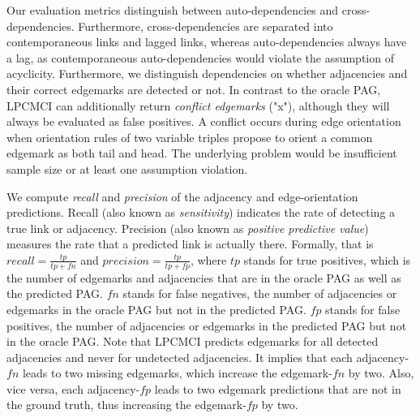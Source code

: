 \documentclass[conference]{IEEEtran}
\begin{document}
Our evaluation metrics distinguish between auto-dependencies and cross-dependencies. Furthermore, cross-dependencies are separated into contemporaneous links and lagged links, whereas auto-dependencies always have a lag, as contemporaneous auto-dependencies would violate the assumption of acyclicity.
Furthermore, we distinguish dependencies on whether adjacencies and their correct edgemarks are detected or not. In contrast to the oracle PAG, LPCMCI can additionally return \textit{conflict edgemarks} ("x"), although they will always be evaluated as false positives.
A conflict occurs during edge orientation when orientation rules of two variable triples propose to orient a common edgemark as both tail and head\cite{runge_pcmci_2020}. The underlying problem would be insufficient sample size or at least one assumption violation\cite{runge_tigramite_2022}.

We compute \textit{recall} and \textit{precision} of the adjacency and edge-orientation predictions. Recall (also known as \textit{sensitivity}) indicates the rate of detecting a true link or adjacency. Precision (also known as \textit{positive predictive value}) measures the rate that a predicted link is actually there. Formally, that is $recall = \frac{tp}{tp+fn}$ and $precision = \frac{tp}{tp+fp}$, where
$tp$ stands for true positives, which is the number of edgemarks and adjacencies that are in the oracle PAG as well as the predicted PAG.
$fn$ stands for false negatives,  the number of adjacencies or edgemarks in the oracle PAG but not in the predicted PAG.
$fp$ stands for false positives, the number of adjacencies or edgemarks in the predicted PAG but not in the oracle PAG.
Note that LPCMCI predicts edgemarks for all detected adjacencies and never for undetected adjacencies. It implies that each adjacency-$fn$ leads to two missing edgemarks, which increase the edgemark-$fn$ by two.
Also, vice versa, each adjacency-$fp$ leads to two edgemark predictions that are not in the ground truth, thus increasing the edgemark-$fp$ by two.
\end{document}
